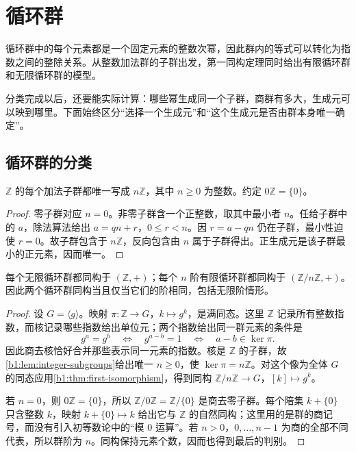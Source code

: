 
\section{循环群}
\label{b1:sec:0301}

%
%

循环群中的每个元素都是一个固定元素的整数次幂，因此群内的等式可以转化为指数之间的整除关系。从整数加法群的子群出发，第一同构定理同时给出有限循环群和无限循环群的模型。

\ProseParagraphBreak
分类完成以后，还要能实际计算：哪些幂生成同一个子群，商群有多大，生成元可以映到哪里。下面始终区分“选择一个生成元”和“这个生成元是否由群本身唯一确定”。

\subsection{循环群的分类}
\label{b1:subsec:0301:01}

\begin{lemma}\label{b1:lem:integer-subgroups}
	\(\mathbb Z\) 的每个加法子群都唯一写成 \(n\mathbb Z\)，其中 \(n\geq0\) 为整数。约定 \(0\mathbb Z=\{0\}\)。
\end{lemma}
\begin{proof}
	零子群对应 \(n=0\)。非零子群含一个正整数，取其中最小者 \(n\)。任给子群中的 \(a\)，除法算法给出 \(a=qn+r\)，\(0\leq r<n\)。因 \(r=a-qn\) 仍在子群，最小性迫使 \(r=0\)。故子群包含于 \(n\mathbb Z\)，反向包含由 \(n\) 属于子群得出。正生成元是该子群最小的正元素，因而唯一。
\end{proof}

\begin{theorem}[循环群分类]\label{b1:thm:cyclic-classification}
	每个无限循环群都同构于 \((\mathbb Z,+)\)；每个 \(n\) 阶有限循环群都同构于 \((\mathbb Z/n\mathbb Z,+)\)。因此两个循环群同构当且仅当它们的阶相同，包括无限阶情形。
\end{theorem}
\begin{proof}
	设 \(G=\langle g\rangle\)。映射 \(\pi:\mathbb Z\rightarrow G\)，\(k\mapsto g^k\)，是满同态。这里 \(\mathbb Z\) 记录所有整数指数，而核记录哪些指数给出单位元；两个指数给出同一群元素的条件是
	\[
		g^a=g^b\quad\Longleftrightarrow\quad g^{a-b}=1 \quad\Longleftrightarrow\quad a-b\in\ker\pi.
	\]
	因此商去核恰好合并那些表示同一元素的指数。核是 \(\mathbb Z\) 的子群，故\cref{b1:lem:integer-subgroups}给出唯一 \(n\geq0\)，使 \(\ker\pi=n\mathbb Z\)。对这个像为全体 \(G\) 的同态应用\cref{b1:thm:first-isomorphism}，得到同构 \(\mathbb Z/n\mathbb Z\rightarrow G\)，\([k]\mapsto g^k\)。

	若 \(n=0\)，则 \(0\mathbb Z=\{0\}\)，所以 \(\mathbb Z/0\mathbb Z=\mathbb Z/\{0\}\) 是商去零子群。每个陪集 \(k+\{0\}\) 只含整数 \(k\)，映射 \(k+\{0\}\mapsto k\) 给出它与 \(\mathbb Z\) 的自然同构；这里用的是群的商记号，而没有引入初等数论中的“模 \(0\) 运算”。若 \(n>0\)，\(0,\ldots,n-1\) 为商的全部不同代表，所以群阶为 \(n\)。同构保持元素个数，因而也得到最后的判别。
\end{proof}

